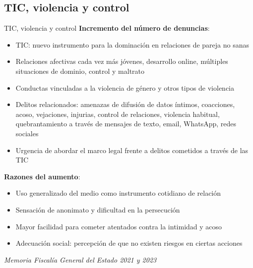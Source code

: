 \documentclass{beamer}
\begin{document}
    \subsection{TIC, violencia y control}
    \begin{frame}{TIC, violencia y control}
        \textbf{Incremento del número de denuncias}:
        \begin{itemize}
            \footnotesize
            \item TIC: nuevo instrumento para la dominación en relaciones de pareja no sanas
            \item Relaciones afectivas cada vez más jóvenes, desarrollo online, múltiples situaciones de dominio, control y maltrato
            \item Conductas vinculadas a la violencia de género y otros tipos de violencia
            \item Delitos relacionados: amenazas de difusión de datos íntimos, coacciones, acoso, vejaciones, injurias, control de relaciones, violencia habitual, quebrantamiento a través de mensajes de texto, email, WhatsApp, redes sociales
            \item Urgencia de abordar el marco legal frente a delitos cometidos a través de las TIC
        \end{itemize}
        \textbf{Razones del aumento}:
        \begin{itemize}
            \footnotesize
            \item Uso generalizado del medio como instrumento cotidiano de relación
            \item Sensación de anonimato y dificultad en la persecución
            \item Mayor facilidad para cometer atentados contra la intimidad y acoso
            \item Adecuación social: percepción de que no existen riesgos en ciertas acciones
        \end{itemize}
        \begin{flushright}
            \footnotesize
            \textit{Memoria Fiscalía General del Estado 2021 y 2023}
        \end{flushright}
    \end{frame}
\end{document}
